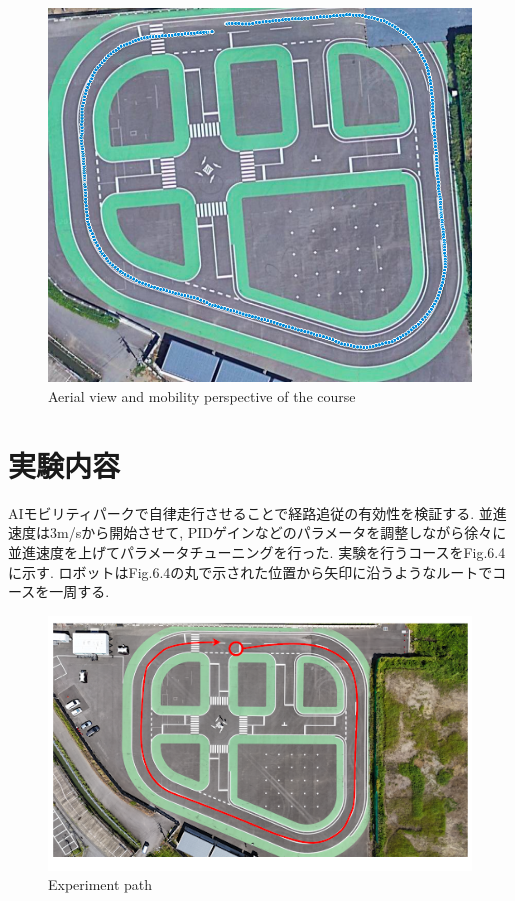 \begin{figure}[H]
  \centering
 \includegraphics[keepaspectratio, scale=0.3]
      {images/targetpath.png}
 \caption{Aerial view and mobility perspective of the course}
 \label{fig:course}
\end{figure}

\section{実験内容}
AIモビリティパークで自律走行させることで経路追従の有効性を検証する.
並進速度は3m/sから開始させて, PIDゲインなどのパラメータを調整しながら徐々に並進速度を上げてパラメータチューニングを行った.
実験を行うコースをFig.6.4に示す.
ロボットはFig.6.4の丸で示された位置から矢印に沿うようなルートでコースを一周する.

\begin{figure}[H]
  \centering
 \includegraphics[keepaspectratio, scale=0.6]
      {images/AIFormulapath.png}
 \caption{Experiment path}
 \label{fig:path}
\end{figure}

